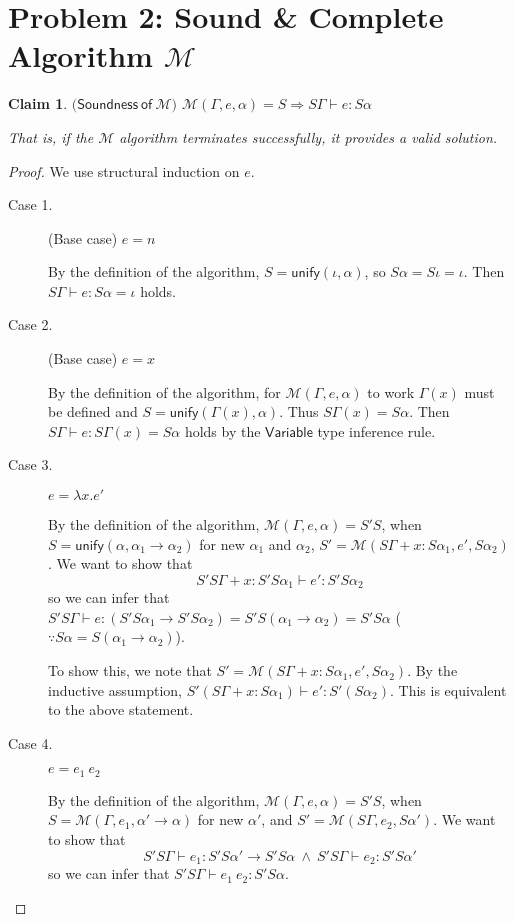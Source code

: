 \documentclass{article}
\newtheorem{clm}{Claim}[section]
\begin{document}
\section{Problem 2: Sound \& Complete Algorithm $\mathcal{M}$}
\begin{clm}$\mathsf{(Soundness \: of\:} \mathcal{M}\mathsf{)}$
$\mathcal{M}(\Gamma, e, \alpha) = S \Rightarrow S\Gamma \vdash e : S\alpha$

That is, if the $\mathcal{M}$ algorithm terminates successfully, it provides a valid solution.
\end{clm}
\begin{proof}
We use structural induction on $e$.

\begin{description}
\item[Case 1.] (Base case) $e = n$

By the definition of the algorithm, $S = \mathsf{unify}(\iota, \alpha)$, so $S\alpha = S\iota = \iota$. Then $S\Gamma \vdash e : S\alpha = \iota$ holds.

\item[Case 2.] (Base case) $e = x$

By the definition of the algorithm, for $\mathcal{M}(\Gamma, e, \alpha)$ to work $\Gamma(x)$ must be defined and $S = \mathsf{unify}(\Gamma(x), \alpha)$. Thus $S\Gamma(x) = S\alpha$. Then $S\Gamma \vdash e : S\Gamma(x) = S\alpha$ holds by the $\mathsf{Variable}$ type inference rule.

\item[Case 3.] $e = \lambda x.e'$

By the definition of the algorithm, $\mathcal{M}(\Gamma, e, \alpha) = S'S$, when $S = \mathsf{unify}(\alpha, \alpha_1 \rightarrow \alpha_2)$ for new $\alpha_1$ and $\alpha_2$, $S' = \mathcal{M}(S\Gamma + x : S\alpha_1, e', S\alpha_2)$. We want to show that 
\[S'S\Gamma + x : S'S\alpha_1 \vdash e' : S'S\alpha_2\] so we can infer that $S'S\Gamma \vdash e : (S'S\alpha_1 \rightarrow S'S\alpha_2) = S'S(\alpha_1 \rightarrow \alpha_2) = S'S\alpha$ ($\because S\alpha = S(\alpha_1 \rightarrow \alpha_2)$).

To show this, we note that $S' = \mathcal{M}(S\Gamma + x : S\alpha_1, e', S\alpha_2)$. By the inductive assumption, $S'(S\Gamma + x : S\alpha_1) \vdash e' : S'(S\alpha_2)$. This is equivalent to the above statement.

\item[Case 4.] $e = e_1 \: e_2$

By the definition of the algorithm, $\mathcal{M}(\Gamma, e, \alpha) = S'S$, when $S = \mathcal{M}(\Gamma, e_1, \alpha'\rightarrow\alpha)$ for new $\alpha'$, and $S' = \mathcal{M}(S\Gamma, e_2, S\alpha')$. We want to show that
\[S'S\Gamma \vdash e_1 : S'S\alpha' \rightarrow S'S\alpha \:\wedge\: S'S\Gamma \vdash e_2 : S'S\alpha' \] so we can infer that $S'
S\Gamma \vdash e_1 \: e_2 : S'S\alpha$.


\end{description}
\end{proof}
\end{document}

